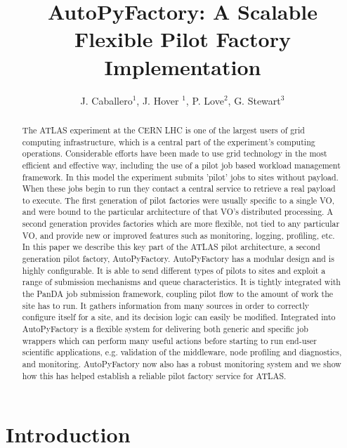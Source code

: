 \documentclass[a4paper]{jpconf}
\begin{document}
\title{AutoPyFactory: A Scalable Flexible Pilot Factory Implementation}

\author{J. Caballero$^1$, J. Hover $^1$, P. Love$^2$, G. Stewart$^3$}

\address{$^1$ Brookhaven National Laboratory, PO BOX 5000 Upton, NY 11973, USA}
\address{$^2$ Department of Physics, Lancaster University, Lancaster, LA1 4YB, UK }
\address{$^3$ Department of Physics and Astronomy, University of Glasgow, Glasgow G12 8QQ, UK}


\begin{abstract}
The ATLAS experiment at the CERN LHC is one of the largest users of grid computing
infrastructure, which is a central part of the experiment's computing operations.
Considerable efforts have been made to use grid technology in the most efficient
and effective way, including the use of a pilot job based workload management framework.
In this model the experiment submits 'pilot' jobs to sites without payload. When these
jobs begin to run they contact a central service to retrieve a real payload to execute. 
The first generation of pilot factories were usually specific to a single VO, 
and were bound to the particular architecture of that VO's distributed processing. 
A second generation provides factories which are more flexible, not tied to any
particular VO, and provide new or improved features such as monitoring, logging, profiling, etc.
In this paper we describe this key part of the ATLAS pilot architecture, a second
generation pilot factory, AutoPyFactory.
AutoPyFactory has a modular design and is highly configurable. It is able to send
different types of pilots to sites and exploit a range of submission mechanisms
and queue characteristics. It is tightly integrated with the PanDA job submission framework,
coupling pilot flow to the amount of work the site has to run. It gathers information
from many sources in order to correctly configure itself for a site, and its decision logic
can easily be modified.
Integrated into AutoPyFactory is a flexible system for delivering both generic and
specific job wrappers which can perform many useful actions before starting to run
end-user scientific applications, e.g. validation of the middleware, node profiling
and diagnostics, and monitoring.
AutoPyFactory now also has a robust monitoring system and we show how this has helped
establish a reliable pilot factory service for ATLAS.
\end{abstract}


\section{Introduction}
\end{document}
